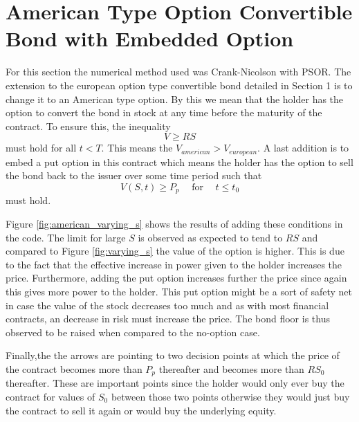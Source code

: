 \documentclass{article}
\begin{document}
\section{American Type Option Convertible Bond with Embedded Option}
For this section the numerical method used was Crank-Nicolson with PSOR.
The extension to the european option type convertible bond detailed in Section 1 is to change it to an American type option.
By this we mean that the holder has the option to convert the bond in stock at any time before the maturity of the contract.
To ensure this, the inequality
\begin{equation}
  V \geq RS
  \label{eq:inequality}
\end{equation}
must hold for all $t<T$.
This means the $V_{american}>V_{european}$.
A last addition is to embed a put option in this contract which means the holder has the option to sell the bond back to the issuer over some time period such that
\begin{equation}
  V(S,t) \geq P_p \hspace{15pt} \text{for} \hspace{15pt} t \leq t_0
  \label{eq:inequality_2}
\end{equation}
must hold.
\\
\par Figure \ref{fig:american_varying_s} shows the results of adding these conditions in the code.
The limit for large $S$ is observed as expected to tend to $RS$ and compared to Figure \ref{fig:varying_s} the value of the option is higher.
This is due to the fact that the effective increase in power given to the holder increases the price.
Furthermore, adding the put option increases further the price since again this gives more power to the holder.
This put option might be a sort of safety net in case the value of the stock decreases too much and as with most financial contracts, an decrease in risk must increase the price.
The bond floor is thus observed to be raised when compared to the no-option case.
\\
\par Finally,the the arrows are pointing to two decision points at which the price of the contract becomes more than $P_p$ thereafter and becomes more than $RS_0$ thereafter.
These are important points since the holder would only ever buy the contract for values of $S_0$ between those two points otherwise they would just buy the contract to sell it again or would buy the underlying equity.
\end{document}
